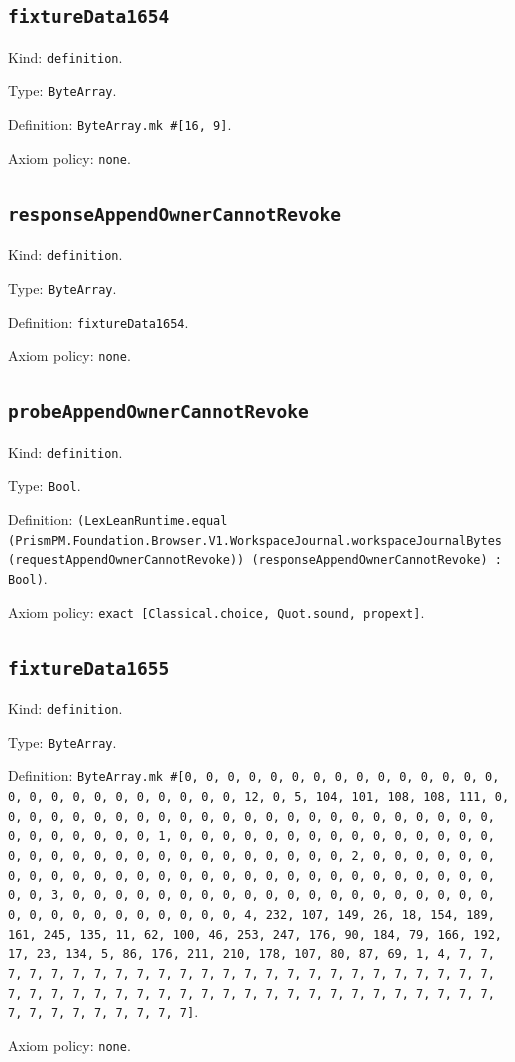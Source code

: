 \documentclass[11pt]{article}
\begin{document}
\subsection*{\texttt{fixtureData1654}}
\noindent Kind: \texttt{definition}.\par
\noindent Type: \texttt{ByteArray}.\par
\noindent Definition: \texttt{ByteArray.mk \#[16, 9]}.\par
\noindent Axiom policy: \texttt{none}.\par
\subsection*{\texttt{responseAppendOwnerCannotRevoke}}
\noindent Kind: \texttt{definition}.\par
\noindent Type: \texttt{ByteArray}.\par
\noindent Definition: \texttt{fixtureData1654}.\par
\noindent Axiom policy: \texttt{none}.\par
\subsection*{\texttt{probeAppendOwnerCannotRevoke}}
\noindent Kind: \texttt{definition}.\par
\noindent Type: \texttt{Bool}.\par
\noindent Definition: \texttt{(LexLeanRuntime.equal (PrismPM.Foundation.Browser.V1.WorkspaceJournal.workspaceJournalBytes (requestAppendOwnerCannotRevoke)) (responseAppendOwnerCannotRevoke) : Bool)}.\par
\noindent Axiom policy: \texttt{exact [Classical.choice, Quot.sound, propext]}.\par
\subsection*{\texttt{fixtureData1655}}
\noindent Kind: \texttt{definition}.\par
\noindent Type: \texttt{ByteArray}.\par
\noindent Definition: \texttt{ByteArray.mk \#[0, 0, 0, 0, 0, 0, 0, 0, 0, 0, 0, 0, 0, 0, 0, 0, 0, 0, 0, 0, 0, 0, 0, 0, 0, 0, 12, 0, 5, 104, 101, 108, 108, 111, 0, 0, 0, 0, 0, 0, 0, 0, 0, 0, 0, 0, 0, 0, 0, 0, 0, 0, 0, 0, 0, 0, 0, 0, 0, 0, 0, 0, 0, 0, 0, 1, 0, 0, 0, 0, 0, 0, 0, 0, 0, 0, 0, 0, 0, 0, 0, 0, 0, 0, 0, 0, 0, 0, 0, 0, 0, 0, 0, 0, 0, 0, 0, 2, 0, 0, 0, 0, 0, 0, 0, 0, 0, 0, 0, 0, 0, 0, 0, 0, 0, 0, 0, 0, 0, 0, 0, 0, 0, 0, 0, 0, 0, 0, 0, 3, 0, 0, 0, 0, 0, 0, 0, 0, 0, 0, 0, 0, 0, 0, 0, 0, 0, 0, 0, 0, 0, 0, 0, 0, 0, 0, 0, 0, 0, 0, 0, 4, 232, 107, 149, 26, 18, 154, 189, 161, 245, 135, 11, 62, 100, 46, 253, 247, 176, 90, 184, 79, 166, 192, 17, 23, 134, 5, 86, 176, 211, 210, 178, 107, 80, 87, 69, 1, 4, 7, 7, 7, 7, 7, 7, 7, 7, 7, 7, 7, 7, 7, 7, 7, 7, 7, 7, 7, 7, 7, 7, 7, 7, 7, 7, 7, 7, 7, 7, 7, 7, 7, 7, 7, 7, 7, 7, 7, 7, 7, 7, 7, 7, 7, 7, 7, 7, 7, 7, 7, 7, 7, 7, 7, 7, 7]}.\par
\noindent Axiom policy: \texttt{none}.\par
\end{document}
